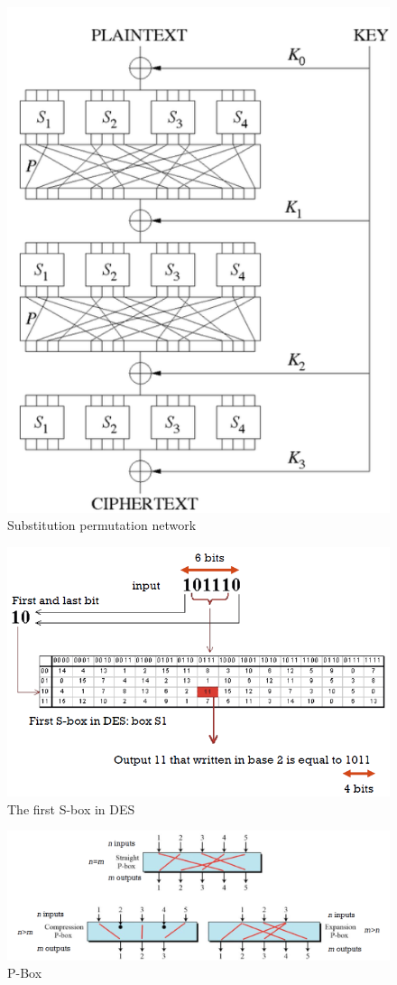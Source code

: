 \begin{figure}
	\centering
	\includegraphics[width=0.7\linewidth]{Images/Chapter3/DES_Rounds}
	\caption{Substitution permutation network}
	\label{fig:DES_Rounds}
\end{figure}


\begin{figure}
	\centering
	\includegraphics[width=0.7\linewidth]{Images/Chapter3/DES_S_Box}
	\caption{The first S-box in DES}
	\label{fig:DES_S_Box}
\end{figure}


\begin{figure}
	\centering
	\includegraphics[width=0.7\linewidth]{Images/Chapter3/Types_P_Boxes}
	\caption{P-Box}
	\label{fig:Types_P_Boxes}
\end{figure}


